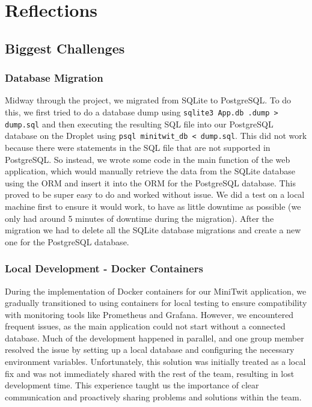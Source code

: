 \documentclass[12pt,a4paper,reqno]{report}
\begin{document}
\section{Reflections}


\subsection{Biggest Challenges}

\subsubsection{Database Migration}

Midway through the project, we migrated from SQLite to PostgreSQL. To do this, we first tried to do a database dump using \texttt{sqlite3 App.db .dump > dump.sql} and then executing the resulting SQL file into our PostgreSQL database on the Droplet using \texttt{psql minitwit\_db < dump.sql}. This did not work because there were statements in the SQL file that are not supported in PostgreSQL. So instead, we wrote some code in the main function of the web application, which would manually retrieve the data from the SQLite database using the ORM and insert it into the ORM for the PostgreSQL database. This proved to be super easy to do and worked without issue. We did a test on a local machine first to ensure it would work, to have as little downtime as possible (we only had around 5 minutes of downtime during the migration). After the migration we had to delete all the SQLite database migrations and create a new one for the PostgreSQL database.

\subsubsection{Local Development - Docker Containers}
During the implementation of Docker containers for our MiniTwit application, we gradually transitioned to using containers for local testing to ensure compatibility with monitoring tools like Prometheus and Grafana. However, we encountered frequent issues, as the main application could not start without a connected database. Much of the development happened in parallel, and one group member resolved the issue by setting up a local database and configuring the necessary environment variables. Unfortunately, this solution was initially treated as a local fix and was not immediately shared with the rest of the team, resulting in lost development time. This experience taught us the importance of clear communication and proactively sharing problems and solutions within the team.
\end{document}

